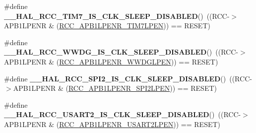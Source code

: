 \begin{DoxyCompactItemize}
\item 
\hypertarget{group___r_c_c___a_p_b1___clock___sleep___enable___disable___status_ga64c55482f4bb2cdb236796b18c28d786}{\#define {\bfseries \-\_\-\-\_\-\-H\-A\-L\-\_\-\-R\-C\-C\-\_\-\-T\-I\-M7\-\_\-\-I\-S\-\_\-\-C\-L\-K\-\_\-\-S\-L\-E\-E\-P\-\_\-\-D\-I\-S\-A\-B\-L\-E\-D}()~((R\-C\-C-\/$>$A\-P\-B1\-L\-P\-E\-N\-R \& (\hyperlink{group___peripheral___registers___bits___definition_gab7867dc2695855fa9084a13d06a4299f}{R\-C\-C\-\_\-\-A\-P\-B1\-L\-P\-E\-N\-R\-\_\-\-T\-I\-M7\-L\-P\-E\-N})) == R\-E\-S\-E\-T)}\label{group___r_c_c___a_p_b1___clock___sleep___enable___disable___status_ga64c55482f4bb2cdb236796b18c28d786}

\item 
\hypertarget{group___r_c_c___a_p_b1___clock___sleep___enable___disable___status_ga3cbf3b3683a84bac98b6d15d921f5ec8}{\#define {\bfseries \-\_\-\-\_\-\-H\-A\-L\-\_\-\-R\-C\-C\-\_\-\-W\-W\-D\-G\-\_\-\-I\-S\-\_\-\-C\-L\-K\-\_\-\-S\-L\-E\-E\-P\-\_\-\-D\-I\-S\-A\-B\-L\-E\-D}()~((R\-C\-C-\/$>$A\-P\-B1\-L\-P\-E\-N\-R \& (\hyperlink{group___peripheral___registers___bits___definition_ga13f3db4ac67bf32c994364cc43f4fe8b}{R\-C\-C\-\_\-\-A\-P\-B1\-L\-P\-E\-N\-R\-\_\-\-W\-W\-D\-G\-L\-P\-E\-N})) == R\-E\-S\-E\-T)}\label{group___r_c_c___a_p_b1___clock___sleep___enable___disable___status_ga3cbf3b3683a84bac98b6d15d921f5ec8}

\item 
\hypertarget{group___r_c_c___a_p_b1___clock___sleep___enable___disable___status_ga38ba0cbb661739ca615881f2ecfcd1c4}{\#define {\bfseries \-\_\-\-\_\-\-H\-A\-L\-\_\-\-R\-C\-C\-\_\-\-S\-P\-I2\-\_\-\-I\-S\-\_\-\-C\-L\-K\-\_\-\-S\-L\-E\-E\-P\-\_\-\-D\-I\-S\-A\-B\-L\-E\-D}()~((R\-C\-C-\/$>$A\-P\-B1\-L\-P\-E\-N\-R \& (\hyperlink{group___peripheral___registers___bits___definition_ga41dcbf845448cbb1b75c0ad7e83b77cb}{R\-C\-C\-\_\-\-A\-P\-B1\-L\-P\-E\-N\-R\-\_\-\-S\-P\-I2\-L\-P\-E\-N})) == R\-E\-S\-E\-T)}\label{group___r_c_c___a_p_b1___clock___sleep___enable___disable___status_ga38ba0cbb661739ca615881f2ecfcd1c4}

\item 
\hypertarget{group___r_c_c___a_p_b1___clock___sleep___enable___disable___status_gad83f4e02928278fc0d9373020a82f4e0}{\#define {\bfseries \-\_\-\-\_\-\-H\-A\-L\-\_\-\-R\-C\-C\-\_\-\-U\-S\-A\-R\-T2\-\_\-\-I\-S\-\_\-\-C\-L\-K\-\_\-\-S\-L\-E\-E\-P\-\_\-\-D\-I\-S\-A\-B\-L\-E\-D}()~((R\-C\-C-\/$>$A\-P\-B1\-L\-P\-E\-N\-R \& (\hyperlink{group___peripheral___registers___bits___definition_ga6055c39af369463e14d6ff2017043671}{R\-C\-C\-\_\-\-A\-P\-B1\-L\-P\-E\-N\-R\-\_\-\-U\-S\-A\-R\-T2\-L\-P\-E\-N})) == R\-E\-S\-E\-T)}\label{group___r_c_c___a_p_b1___clock___sleep___enable___disable___status_gad83f4e02928278fc0d9373020a82f4e0}


\end{DoxyCompactItemize}
